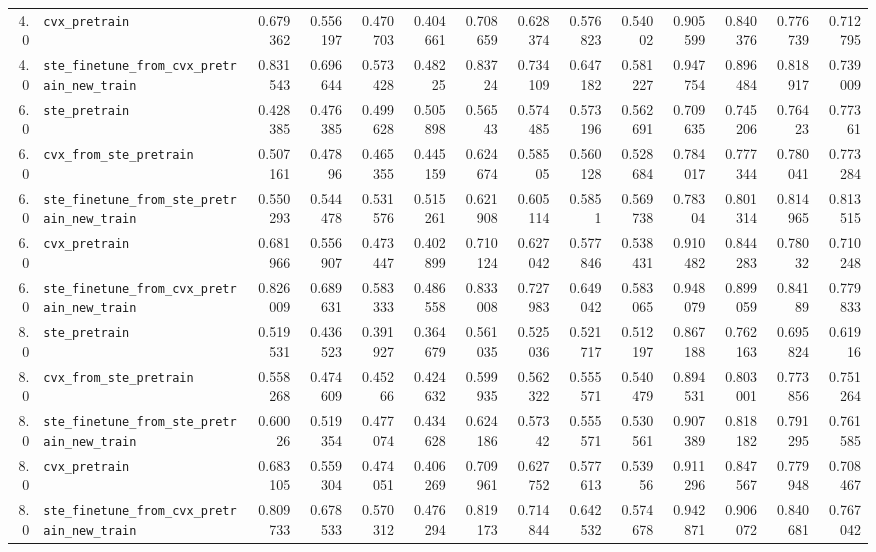 \begin{longtable}{@{}r l *{12}{r}@{}}
4.0 & \texttt{cvx\_pretrain} & 0.679362 & 0.556197 & 0.470703 & 0.404661 & 0.708659 & 0.628374 & 0.576823 & 0.54002 & 0.905599 & 0.840376 & 0.776739 & 0.712795 \\
4.0 & \texttt{ste\_finetune\_from\_cvx\_pretrain\_new\_train} & 0.831543 & 0.696644 & 0.573428 & 0.48225 & 0.83724 & 0.734109 & 0.647182 & 0.581227 & 0.947754 & 0.896484 & 0.818917 & 0.739009 \\
6.0 & \texttt{ste\_pretrain} & 0.428385 & 0.476385 & 0.499628 & 0.505898 & 0.56543 & 0.574485 & 0.573196 & 0.562691 & 0.709635 & 0.745206 & 0.76423 & 0.77361 \\
6.0 & \texttt{cvx\_from\_ste\_pretrain} & 0.507161 & 0.47896 & 0.465355 & 0.445159 & 0.624674 & 0.58505 & 0.560128 & 0.528684 & 0.784017 & 0.777344 & 0.780041 & 0.773284 \\
6.0 & \texttt{ste\_finetune\_from\_ste\_pretrain\_new\_train} & 0.550293 & 0.544478 & 0.531576 & 0.515261 & 0.621908 & 0.605114 & 0.5851 & 0.569738 & 0.78304 & 0.801314 & 0.814965 & 0.813515 \\
6.0 & \texttt{cvx\_pretrain} & 0.681966 & 0.556907 & 0.473447 & 0.402899 & 0.710124 & 0.627042 & 0.577846 & 0.538431 & 0.910482 & 0.844283 & 0.78032 & 0.710248 \\
6.0 & \texttt{ste\_finetune\_from\_cvx\_pretrain\_new\_train} & 0.826009 & 0.689631 & 0.583333 & 0.486558 & 0.833008 & 0.727983 & 0.649042 & 0.583065 & 0.948079 & 0.899059 & 0.84189 & 0.779833 \\
8.0 & \texttt{ste\_pretrain} & 0.519531 & 0.436523 & 0.391927 & 0.364679 & 0.561035 & 0.525036 & 0.521717 & 0.512197 & 0.867188 & 0.762163 & 0.695824 & 0.61916 \\
8.0 & \texttt{cvx\_from\_ste\_pretrain} & 0.558268 & 0.474609 & 0.45266 & 0.424632 & 0.599935 & 0.562322 & 0.555571 & 0.540479 & 0.894531 & 0.803001 & 0.773856 & 0.751264 \\
8.0 & \texttt{ste\_finetune\_from\_ste\_pretrain\_new\_train} & 0.60026 & 0.519354 & 0.477074 & 0.434628 & 0.624186 & 0.57342 & 0.555571 & 0.530561 & 0.907389 & 0.818182 & 0.791295 & 0.761585 \\
8.0 & \texttt{cvx\_pretrain} & 0.683105 & 0.559304 & 0.474051 & 0.406269 & 0.709961 & 0.627752 & 0.577613 & 0.53956 & 0.911296 & 0.847567 & 0.779948 & 0.708467 \\
8.0 & \texttt{ste\_finetune\_from\_cvx\_pretrain\_new\_train} & 0.809733 & 0.678533 & 0.570312 & 0.476294 & 0.819173 & 0.714844 & 0.642532 & 0.574678 & 0.942871 & 0.906072 & 0.840681 & 0.767042 \\

\end{longtable}

